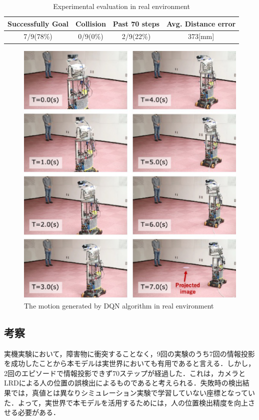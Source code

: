 \documentclass[12pt]{sonota/aislab}
\begin{document}
\begin{table}[t]
	\caption{Experimental evaluation in real environment}
	\label{table:evaluation_real_world}
	\centering 
	\begin{tabular}[tbp]{|c|c|c|c|}
	    \hline
		Successfully Goal & Collision & Past 70 steps & Avg. Distance error \\\hline\hline
		7/9(78\%) & 0/9(0\%) & 2/9(22\%) & 373[mm] \\\hline
	\end{tabular}
\end{table}

\begin{figure}[t]
\begin{center}
\includegraphics[clip, width=13cm]{figs/real_experiment_motion.eps}
\caption{The motion generated by DQN algorithm in real environment}
\label{real_experiment_motion}
\end{center}
\end{figure}

\subsection{考察}
実機実験において，障害物に衝突することなく，9回の実験のうち7回の情報投影を成功したことから本モデルは実世界においても有用であると言える．しかし，2回のエピソードで情報投影できず70ステップが経過した．これは，カメラとLRDによる人の位置の誤検出によるものであると考えられる．失敗時の検出結果では，真値とは異なりシミュレーション実験で学習していない座標となっていた．よって，実世界で本モデルを活用するためには，人の位置検出精度を向上させる必要がある．
\end{document}
